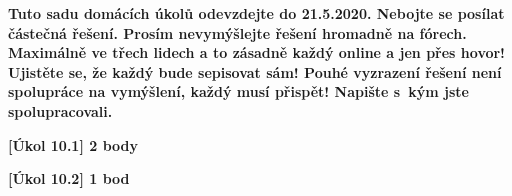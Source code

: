 \textbf{
	Tuto sadu domácích úkolů odevzdejte do 21.5.2020.
	Nebojte se posílat částečná řešení.
	Prosím nevymýšlejte řešení hromadně na fórech.
	Maximálně ve třech lidech a to zásadně každý online a jen přes hovor!
	Ujistěte se, že každý bude sepisovat sám!
	Pouhé vyzrazení řešení není spolupráce na vymýšlení, každý musí přispět!
	Napište s~kým jste spolupracovali.
}

\textbf{[Úkol 10.1] 2 body}

\textbf{[Úkol 10.2] 1 bod}


